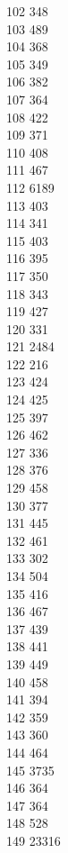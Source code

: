 { 102	348 \\
 103	489 \\
 104	368 \\
 105	349 \\
 106	382 \\
 107	364 \\
 108	422 \\
 109	371 \\
 110	408 \\
 111	467 \\
 112	6189 \\
 113	403 \\
 114	341 \\
 115	403 \\
 116	395 \\
 117	350 \\
 118	343 \\
 119	427 \\
 120	331 \\
 121	2484 \\
 122	216 \\
 123	424 \\
 124	425 \\
 125	397 \\
 126	462 \\
 127	336 \\
 128	376 \\
 129	458 \\
 130	377 \\
 131	445 \\
 132	461 \\
 133	302 \\
 134	504 \\
 135	416 \\
 136	467 \\
 137	439 \\
 138	441 \\
 139	449 \\
 140	458 \\
 141	394 \\
 142	359 \\
 143	360 \\
 144	464 \\
 145	3735 \\
 146	364 \\
 147	364 \\
 148	528 \\
 149	23316 \\
}
